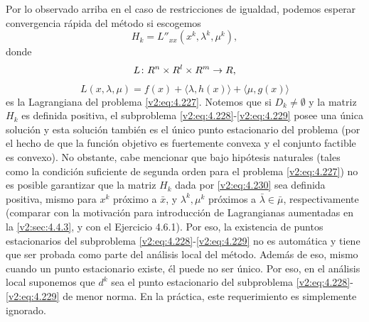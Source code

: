 Por lo observado arriba en el caso de restricciones de igualdad, podemos esperar convergencia rápida del método si escogemos
\begin{equation}
    H_k = L''_{xx}(x^k, \lambda^k, \mu^k),
    \label{v2:eq:4.230}
\end{equation}
donde
\[
    L \colon R^n \times R^l \times R^m \to R,
\]
\[
    L(x, \lambda, \mu) = f(x) + \langle \lambda, h(x) \rangle + \langle \mu, g(x) \rangle
\]
es la Lagrangiana del problema \eqref{v2:eq:4.227}. Notemos que si $D_k \neq \emptyset$ y la matriz $H_k$ es definida positiva, el subproblema \eqref{v2:eq:4.228}-\eqref{v2:eq:4.229} posee una única solución y esta solución también es el único punto estacionario del problema (por el hecho de que la función objetivo es fuertemente convexa y el conjunto factible es convexo). No obstante, cabe mencionar que bajo hipótesis naturales (tales como la condición suficiente de segunda orden para el problema \eqref{v2:eq:4.227}) no es posible garantizar que la matriz $H_k$ dada por \eqref{v2:eq:4.230} sea definida positiva, mismo para $x^k$ próximo a $\bar{x}$, y $\lambda^k, \mu^k$ próximos a $\bar{\lambda} \in \bar{\mu}$, respectivamente (comparar con la motivación para introducción de Lagrangianas aumentadas en la \cref{v2:sec:4.4.3}, y con el Ejercicio 4.6.1). Por eso, la existencia de puntos estacionarios del subproblema \eqref{v2:eq:4.228}-\eqref{v2:eq:4.229} no es automática y tiene que ser probada como parte del análisis local del método. Además de eso, mismo cuando un punto estacionario existe, él puede no ser único. Por eso, en el análisis local suponemos que $d^k$ sea el punto estacionario del subproblema \eqref{v2:eq:4.228}-\eqref{v2:eq:4.229} de menor norma. En la práctica, este requerimiento es simplemente ignorado.

